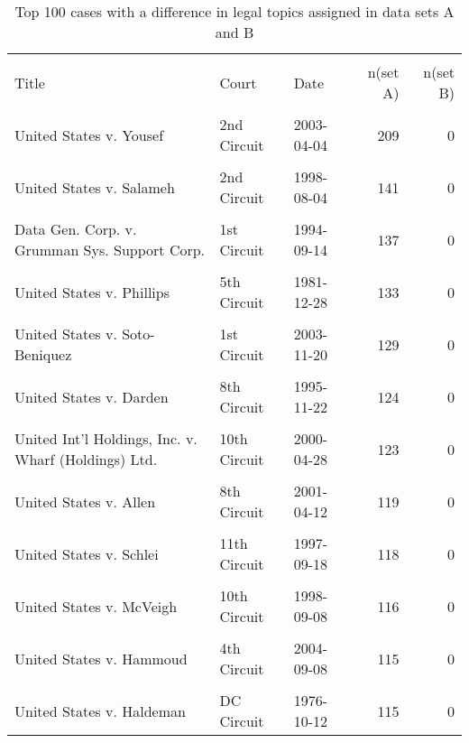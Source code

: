\documentclass[10pt, letterpaper]{article}
\begin{document}
\begin{spacing}{1.0}
\begin{footnotesize}
    \begin{longtable}[H]{p{3.5in}llrr}
        \caption{Top 100 cases with a difference in legal topics assigned in data sets A and B}\\[-4pt]
        \hline\\[-6pt]
        Title & Court & Date & n(set A) & n(set B) \\[2pt]
        \hline\\[-6pt]
        \endhead
        United States v. Yousef & 2nd Circuit & 2003-04-04 & 209 & 0\\
        & & & &\\[-6pt]
        United States v. Salameh & 2nd Circuit & 1998-08-04 & 141 & 0\\
        & & & &\\[-6pt]
        Data Gen. Corp. v. Grumman Sys. Support Corp. & 1st Circuit & 1994-09-14 & 137 & 0\\
        & & & &\\[-6pt]
        United States v. Phillips & 5th Circuit & 1981-12-28 & 133 & 0\\
        & & & &\\[-6pt]
        United States v. Soto-Beniquez & 1st Circuit & 2003-11-20 & 129 & 0\\
        & & & &\\[-6pt]
        United States v. Darden & 8th Circuit & 1995-11-22 & 124 & 0\\
        & & & &\\[-6pt]
        United Int'l Holdings, Inc. v. Wharf (Holdings) Ltd. & 10th Circuit & 2000-04-28 & 123 & 0\\
        & & & &\\[-6pt]
        United States v. Allen & 8th Circuit & 2001-04-12 & 119 & 0\\
        & & & &\\[-6pt]
        United States v. Schlei & 11th Circuit & 1997-09-18 & 118 & 0\\
        & & & &\\[-6pt]
        United States v. McVeigh & 10th Circuit & 1998-09-08 & 116 & 0\\
        & & & &\\[-6pt]
        United States v. Hammoud & 4th Circuit & 2004-09-08 & 115 & 0\\
        & & & &\\[-6pt]
        United States v. Haldeman & DC Circuit & 1976-10-12 & 115 & 0\\

\end{longtable}
\end{footnotesize}
\end{spacing}
\end{document}
